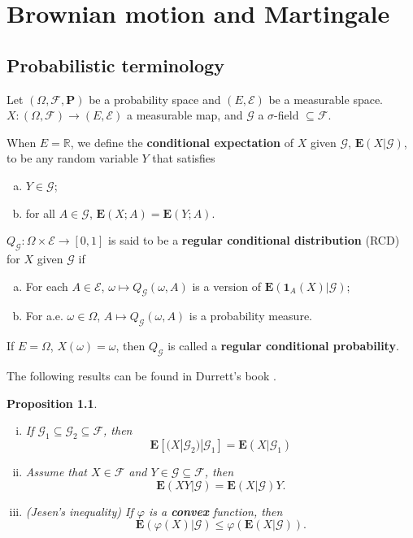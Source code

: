 \documentclass[twoside, 12pt]{book}
\numberwithin{equation}{chapter}
\newtheorem{proposition}[theorem]{Proposition}
\def\cE{{\mathcal E}}
\def\cF{{\mathcal F}}
\def\cG{{\mathcal G}}
\def\mR{{\mathbb R}}
\def\bE{{\mathbf E}}
\def\bP{{\mathbf P}}
\def\leq{\leqslant}
\def\1{{\mathbf{1}}}
\begin{document}
	\chapter{Brownian motion and Martingale}\label{chapt:BM}
	
	\section{Probabilistic terminology}
	
	Let $(\Omega, \cF, \bP)$ be a probability space and $(E, \cE)$ be a measurable space. $X:(\Omega,\cF)\to (E, \cE)$ a measurable map, and $\cG$ a $\sigma$-field $\subseteq \cF$.  
	
	When $E=\mR$, we define the {\bf conditional expectation} of $X$ given $\cG$, $\bE(X|\cG)$, to be any random variable $Y$ that satisfies 
	\begin{enumerate}[(a)]
		\item $Y\in \cG$; 
		\item for all $A\in \cG$, $\bE(X; A)=\bE(Y; A)$. 
	\end{enumerate}
	
	$Q_{\cG}: \Omega\times \cE\to [0,1]$ is said to be a {\bf {regular conditional distribution}} (RCD) for $X$ given $\cG$ if 
	\begin{enumerate}[(a)]
		\item For each $A\in \cE$, $\omega\mapsto Q_{\cG}(\omega, A)$ is a version of $\bE(\1_A(X)|\cG)$; 
		\item For a.e. $\omega\in \Omega$, $A\mapsto Q_{\cG}(\omega, A)$ is a probability measure. 
	\end{enumerate}
	If $E=\Omega$, $X(\omega)=\omega$, then $Q_{\cG}$ is called a {\bf regular conditional probability}. 
	
	The following results can be found in Durrett's book \cite{durrett2019probability}.  
	\begin{proposition}
		\begin{enumerate}[(i)]
			\item If $\cG_1\subseteq \cG_2\subseteq \cF$, then 
			\begin{equation}
				\bE[(X|\cG_2)|\cG_1]=\bE (X|\cG_1)
			\end{equation}
			\item Assume that $X\in \cF$ and $Y\in \cG\subseteq \cF$, then 
			\begin{equation}
				\bE (XY|\cG)=\bE (X|\cG)Y. 
			\end{equation}
			\item (Jesen's inequality) If $\varphi$ is a {\bf convex} function, then 
			\begin{equation}
				\bE (\varphi(X)|\cG) \leq \varphi(\bE (X|\cG)). 
			\end{equation}
		\end{enumerate}
	\end{proposition}
	
\end{document}
